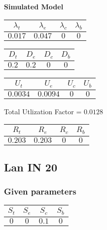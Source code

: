 \documentclass{article}
\begin{document}
\begin{minipage}{0.5\textwidth}
\centering	\textbf{Simulated Model}
\begin{table}[H]
\centering
\begin{tabular}{@{}cccc@{}}
\toprule
$\lambda_t$ & $\lambda_e$ & $\lambda_c$ & $\lambda_b$\\
\midrule
$0.017$ & $0.047$ & $0$ & $0$\\
\bottomrule
\end{tabular}
\end{table}
\begin{table}[H]
\centering
\begin{tabular}{@{}cccc@{}}
\toprule
$D_t$ & $D_e$ & $D_c$ & $D_b$\\
\midrule
$0.2$ & $0.2$ & $0$ & $0$\\
\bottomrule
\end{tabular}
\end{table}\begin{table}[H]
\centering
\begin{tabular}{@{}cccc@{}}
\toprule
$U_t$ & $U_e$ & $U_c$ & $U_b$\\
\midrule
$0.0034$ & $0.0094$ & $0$ & $0$\\
\bottomrule
\end{tabular}
\end{table}
\centering Total Utlization Factor = $0.0128$
\begin{table}[H]
\centering
\begin{tabular}{@{}cccc@{}}
\toprule
$R_t$ & $R_e$ & $R_c$ & $R_b$\\
\midrule
$0.203$ & $0.203$ & $0$ & $0$\\
\bottomrule
\end{tabular}
\end{table}
\end{minipage}\subsection{Lan IN 20}
\subsubsection{Given parameters}
\begin{table}[H]
\centering
\begin{tabular}{@{}cccc@{}}
\toprule
$S_t$ & $S_e$ & $S_c$ & $S_b$\\
\midrule
$0$ & $0$ & $0.1$ & $0$\\
\bottomrule
\end{tabular}
\end{table}
\end{document}
